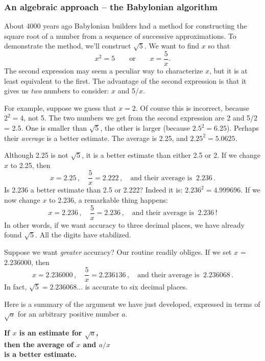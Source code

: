 \subsubsection{An algebraic approach -- the Babylonian algorithm}
\label{subsubsec:an-algebraic-approach----the-babylonian-algorithm}

About 4000 years ago Babylonian builders had a method for constructing
 the square root of a number from a sequence of successive
 approximations.  To demonstrate the method, we'll construct
 $\sqrt{5}$.  We want to find $x$ so that
\[
x^2 = 5 \qquad \mbox{or} \qquad x = \dfrac{5}{x}.
\]
The second expression may seem a peculiar way to characterize $x$, but
 it is at least equivalent to the first.  The advantage of the second
 expression is that it gives us {\em two\/} numbers to consider: $x$
 and 5/$x$.

For example, suppose we guess that $x = 2$.  Of course this is
 incorrect, because $2^2 = 4$, not 5.  The two numbers we get from the
 second expression are 2 and 5/2 = 2.5.  One is smaller than
 $\sqrt{5}$, the other is larger (because $2.5^2 = 6.25$).  Perhaps
 their {\em average\/} is a better estimate.  The average is 2.25, and
 $2.25^2 = 5.0625$.

Although 2.25 is not $\sqrt{5}$, it is a better estimate than either
 2.5 or 2.  If we change $x$ to 2.25, then
\[
x = 2.25 \, , \quad \dfrac{5}{x} = 2.222 \, , \quad
	\mbox{and their average is } \  2.236 \, .
\]
Is 2.236 a better estimate than 2.5 or 2.222?  Indeed it is: $2.236^2
 = 4.999696$.  If we now change $x$ to 2.236, a remarkable thing
 happens:
\[
x = 2.236 \, , \quad \dfrac{5}{x} = 2.236 \, , \quad
	\mbox{and their average is } \  2.236 \, !
\]
In other words, if we want accuracy to three decimal places, we have
 already found $\sqrt{5}$.  All the digits have stabilized.

Suppose we want {\em greater\/} accuracy?  Our routine readily
 obliges.  If we set $x$ = 2.236000, then
\[
x = 2.236000 \, , \quad \dfrac{5}{x} = 2.236136 \, ,
	 \quad \mbox{and their average is } \  2.236068\, .
\]
In fact, $\sqrt{5} = 2.236068\ldots$ is accurate to six decimal
 places.

Here is a summary of the argument we have just developed, expressed in terms of $\sqrt{a}$ for an arbitrary positive number $a$.  
\begin{observation}
\bf If \boldmath $x$ is an estimate
			for \boldmath $\sqrt{a}$, \\
\bf then the average of \boldmath $x$ and
			\boldmath $a/x$ \\
\bf is a better estimate.
\end{observation}


